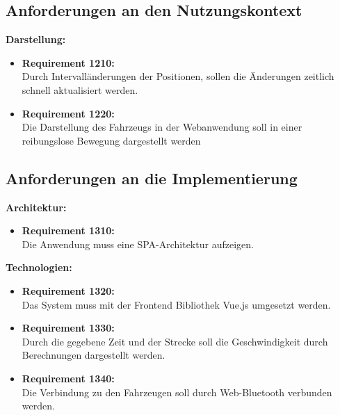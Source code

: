 \subsection*{Anforderungen an den Nutzungskontext}
\textbf{Darstellung:}
\begin{itemize}
\item \textbf{Requirement 1210:}\\
Durch Intervall\"anderungen der Positionen, sollen die \"Anderungen zeitlich schnell aktualisiert werden.
\item \textbf{Requirement 1220:}\\
Die Darstellung des Fahrzeugs in der Webanwendung soll in einer reibungslose Bewegung dargestellt werden
\end{itemize}
\subsection*{Anforderungen an die Implementierung}
\textbf{Architektur:}
\begin{itemize}
\item \textbf{Requirement 1310:}\\
Die Anwendung muss eine \ac{SPA}-Architektur aufzeigen. 
\end{itemize}
\textbf{Technologien:}
\begin{itemize}
\item \textbf{Requirement 1320:}\\
Das System muss mit der Frontend Bibliothek Vue.js umgesetzt werden.
\item \textbf{Requirement 1330:}\\
Durch die gegebene Zeit und der Strecke soll die Geschwindigkeit durch Berechnungen dargestellt werden.
\item \textbf{Requirement 1340:}\\
Die Verbindung zu den Fahrzeugen soll durch Web-Bluetooth verbunden werden.
\end{itemize}
